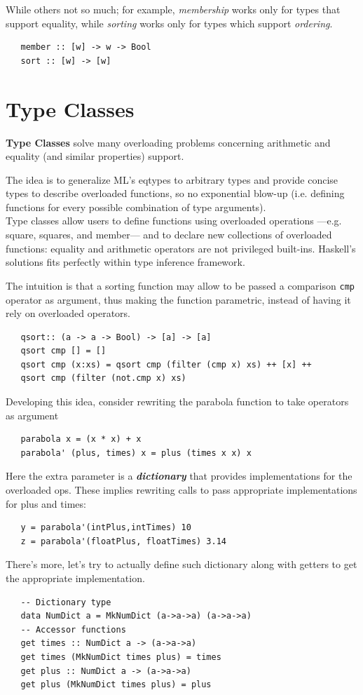 While others not so much;
for example, \textit{membership} works only for types that support equality,
while \textit{sorting} works only for types which support \textit{ordering}. 
\begin{lstlisting}
   member :: [w] -> w -> Bool
   sort :: [w] -> [w]
\end{lstlisting}

\section{Type Classes}
\textbf{Type Classes} solve many overloading problems concerning arithmetic and equality (and similar properties) support.

The idea is to generalize ML’s eqtypes to arbitrary types
and provide concise types to describe overloaded
functions, so no exponential blow-up (i.e. defining functions for every possible combination of type arguments).\\
Type classes allow users to define functions using overloaded
operations {---}e.g. square, squares, and member{---} and to
declare new collections of
overloaded functions: equality and arithmetic
operators are not privileged built-ins.
Haskell's solutions fits perfectly within type inference framework.

The intuition is that a sorting function may allow to be passed a comparison \lstinline|cmp| operator as argument,
thus making the function parametric, instead of having it rely on overloaded operators.
\begin{lstlisting}
   qsort:: (a -> a -> Bool) -> [a] -> [a]
   qsort cmp [] = []
   qsort cmp (x:xs) = qsort cmp (filter (cmp x) xs) ++ [x] ++
   qsort cmp (filter (not.cmp x) xs)
\end{lstlisting}

Developing this idea, consider rewriting the parabola function to take operators as argument
\begin{lstlisting}
   parabola x = (x * x) + x
   parabola' (plus, times) x = plus (times x x) x
\end{lstlisting}
Here the extra parameter is a \textit{\textbf{dictionary}} that provides implementations for the overloaded ops.
These implies rewriting calls to pass appropriate implementations for plus and times:
\begin{lstlisting}
   y = parabola'(intPlus,intTimes) 10
   z = parabola'(floatPlus, floatTimes) 3.14
\end{lstlisting}

There's more, let's try to actually define such dictionary along with getters to get the appropriate implementation.
\begin{lstlisting}
   -- Dictionary type
   data NumDict a = MkNumDict (a->a->a) (a->a->a)
   -- Accessor functions
   get times :: NumDict a -> (a->a->a)
   get times (MkNumDict times plus) = times
   get plus :: NumDict a -> (a->a->a)
   get plus (MkNumDict times plus) = plus
\end{lstlisting}

